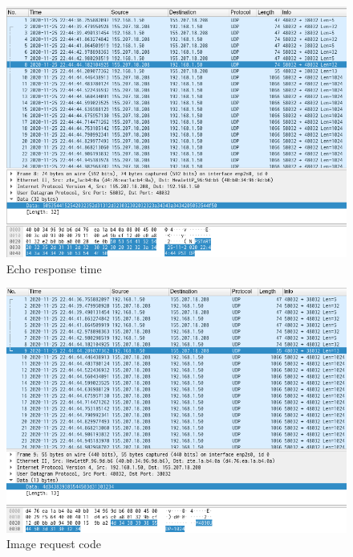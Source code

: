 \documentclass[12pt, a4paper]{article}
\begin{document}
\pagebreak
\begin{figure}[h!]
\centering
	\includegraphics[height=.4\textheight, width=\textwidth, keepaspectratio]{assets/wireshark/image2.png}
	\caption{Echo response time} 
\end{figure}

\begin{figure}[h!]
\centering
	\includegraphics[height=.4\textheight, width=\textwidth, keepaspectratio]{assets/wireshark/image3.png}
	\caption{Image request code} 
\end{figure}
\end{document}
